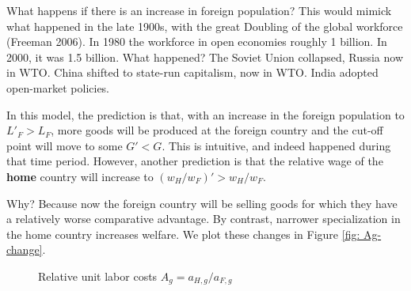 \documentclass[11pt,letterpaper]{article}
\begin{document}
What happens if there is an increase in foreign population? This would mimick what happened in the late 1900s, with the great Doubling of the global workforce (Freeman 2006). In 1980 the workforce in open economies roughly 1 billion. In 2000, it was 1.5 billion. What happened? The Soviet Union collapsed, Russia now in WTO. China shifted to state-run capitalism, now in WTO. India adopted open-market policies.

In this model, the prediction is that, with an increase in the foreign population to $L'_F >L_F$, more goods will be produced at the foreign country and the cut-off point will move to some $G' < G$. This is intuitive, and indeed happened during that time period. However, another prediction is that the relative wage of the \textbf{home} country will increase to $(w_H/w_F)'>w_H/w_F$.

Why? Because now the foreign country will be selling goods for which they have a relatively worse comparative advantage. By contrast, narrower specialization in the home country increases welfare. We plot these changes in Figure \ref{fig: Ag-change}.

    \begin{figure}
        \centering
        \caption{Relative unit labor costs $A_g = a_{H,g} / a_{F,g}$}
        \label{fig: Ag}
    \end{figure}
\end{document}
